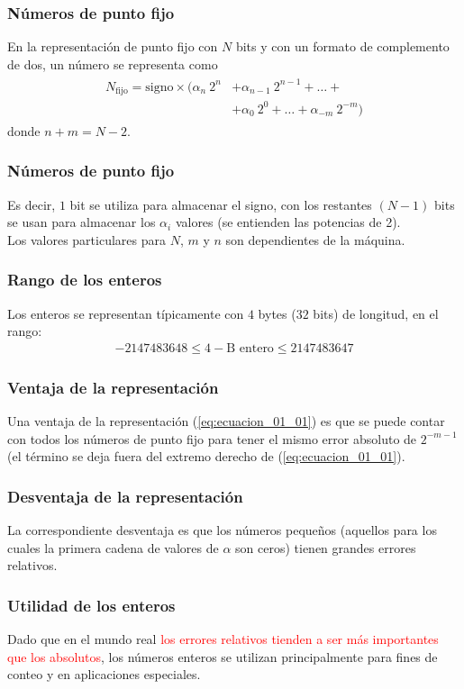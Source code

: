 \documentclass[12pt]{beamer}
\begin{document}
\begin{frame}
\frametitle{Números de punto fijo}
En la representación de punto fijo con $N$ bits y con un formato de complemento de dos, un número se representa como
\begin{align}
\begin{aligned}
N_{\text{fijo}} = \text{signo} \times (\alpha_{n} \: 2^{n} &+ \alpha_{n-1} \: 2^{n-1} + \ldots + \\
&+ \alpha_{0} \: 2^{0} + \ldots + \alpha_{-m} \: 2^{-m} )
\label{eq:ecuacion_01_01}
\end{aligned}
\end{align}
donde $n + m = N - 2$.
\end{frame}
\begin{frame}
\frametitle{Números de punto fijo}
Es decir, $1$ bit se utiliza para almacenar el signo, con los restantes $(N - 1)$ bits se usan para almacenar los $\alpha_{i}$ valores (se entienden las potencias de 2).
\\
\bigskip
\pause
Los valores particulares para $N$, $m$ y $n$ son dependientes de la máquina.
\end{frame}
\begin{frame}
\frametitle{Rango de los enteros}
Los enteros se representan típicamente con $4$ bytes ($32$ bits) de longitud, en el rango:
\pause
\begin{align*}
-2147483648 \leq 4 - \text{B entero} \leq 2147483647
\end{align*}
\end{frame}
\begin{frame}
\frametitle{Ventaja de la representación}
Una ventaja de la representación (\ref{eq:ecuacion_01_01}) es que se puede contar con todos los números de punto fijo para tener el mismo error absoluto de $2^{-m-1}$ (el término se deja fuera del extremo derecho de (\ref{eq:ecuacion_01_01}).
\end{frame}
\begin{frame}
\frametitle{Desventaja de la representación}
 La correspondiente desventaja es que los números pequeños (aquellos para los cuales la primera cadena de valores de $\alpha$ son ceros) tienen grandes errores relativos.
 \end{frame}
 \begin{frame}
 \frametitle{Utilidad de los enteros}
 Dado que en el mundo real \textcolor{red}{los errores relativos tienden a ser más importantes que los absolutos}, los números enteros se utilizan principalmente para fines de conteo y en aplicaciones especiales.
\end{frame}
\end{document}
